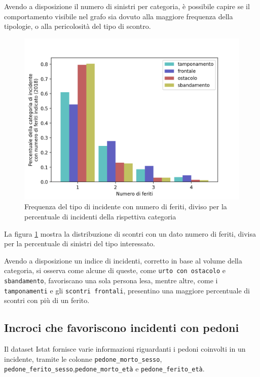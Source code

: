 \documentclass[a4paper,12pt]{report}
\newcommand{\columnstyle}[1]{\texttt{#1}}
\begin{document}
Avendo a disposizione il numero di sinistri per categoria, è possibile capire 
se il comportamento visibile nel grafo sia dovuto alla maggiore frequenza della tipologie, 
o alla pericolosità del tipo di scontro. 

\begin{figure}
    \includegraphics[width=\linewidth]{../src/incidenti/incidenti_senza_coords/natura_incidente/perc_natura_incidente.png}
    \caption{Frequenza del tipo di incidente con numero di feriti, diviso per la percentuale di incidenti della rispettiva categoria}
    \label{fig:perc-numero-feriti}
\end{figure}

La figura \ref{fig:perc-numero-feriti} mostra la distribuzione di scontri con un dato numero 
di feriti, divisa per la percentuale di sinistri del tipo interessato.

Avendo a disposizione un indice di incidenti, corretto in base al volume della categoria, 
si osserva come alcune di queste, come \columnstyle{urto con ostacolo} 
e \columnstyle{sbandamento}, favoriscano una sola persona lesa, mentre altre, 
come i \columnstyle{tamponamenti} e gli \columnstyle{scontri frontali}, presentino 
una maggiore percentuale di scontri con più di un ferito.

\subsection{Incroci che favoriscono incidenti con pedoni}

Il dataset Istat fornisce varie informazioni riguardanti i pedoni coinvolti in un 
incidente, tramite le colonne \columnstyle{pedone\_morto\_sesso}, 
\columnstyle{pedone\_ferito\_sesso},\columnstyle{pedone\_morto\_età} e 
\columnstyle{pedone\_ferito\_età}.
\end{document}
